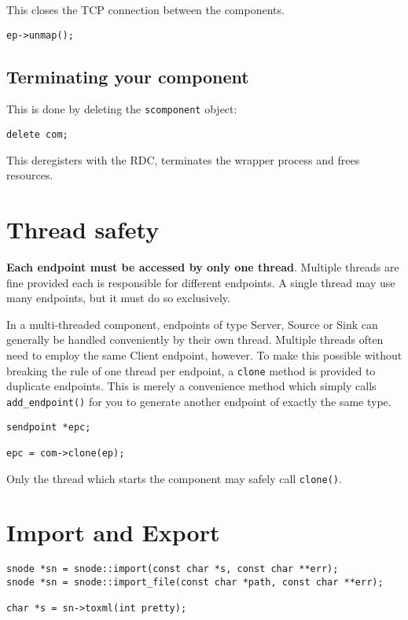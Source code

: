 \documentclass[12pt,a4paper,twoside]{article}
\renewcommand{\_}{\texttt{\symbol{95}}}
\begin{document}
This closes the TCP connection between the components.

\begin{verbatim}
ep->unmap();
\end{verbatim}

\subsection{Terminating your component}

This is done by deleting the \verb^scomponent^ object:

\begin{verbatim}
delete com;
\end{verbatim}

This deregisters with the RDC, terminates the wrapper process and frees
resources.

\section{Thread safety}

\textbf{Each endpoint must be accessed by only one thread}. Multiple threads
are fine provided each is responsible for different endpoints.
A single thread may use many endpoints, but it must do so exclusively.

In a multi-threaded component, endpoints of type Server, Source or Sink
can generally be handled conveniently by their own thread. Multiple
threads often need to employ the same Client endpoint, however.
To make this possible without breaking the rule of one thread per
endpoint, a \verb^clone^ method is provided to duplicate endpoints.
This is merely a convenience method which simply calls
\verb^add_endpoint()^ for you to generate another endpoint of exactly
the same type.

\begin{verbatim}
sendpoint *epc;

epc = com->clone(ep);
\end{verbatim}

Only the thread which starts the component may safely call \verb^clone()^.

\section{Import and Export}

\begin{verbatim}
snode *sn = snode::import(const char *s, const char **err);
snode *sn = snode::import_file(const char *path, const char **err);

char *s = sn->toxml(int pretty);
\end{verbatim}
\end{document}
